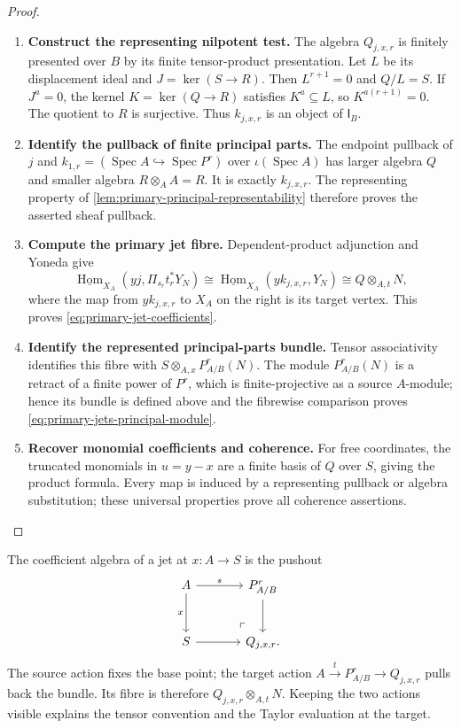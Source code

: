 \documentclass[11pt,a4paper]{article}
\numberwithin{algorithm}{section}
\numberwithin{equation}{section}
\theoremstyle{definition}
\theoremstyle{remark}
\theoremstyle{plain}
\newcommand{\Hom}{\operatorname{Hom}}
\newcommand{\InfB}{\mathsf I_B}
\theoremstyle{definition}
\theoremstyle{plain}
\begin{document}
\begin{proof}\leavevmode
\begin{enumerate}[leftmargin=*,align=left]
\item \textbf{Construct the representing nilpotent test.}
The algebra $Q_{j,x,r}$ is finitely presented over $B$ by its
finite tensor-product presentation.  Let $L$ be its displacement
ideal and $J=\ker(S\to R)$.  Then $L^{r+1}=0$ and $Q/L=S$.
If $J^a=0$, the kernel $K=\ker(Q\to R)$ satisfies $K^a\subseteq L$,
so $K^{a(r+1)}=0$.  The quotient to $R$ is surjective.
Thus $k_{j,x,r}$ is an object of $\InfB$.

\item \textbf{Identify the pullback of finite principal parts.}
The endpoint pullback of $j$ and
$k_{1,r}=(\operatorname{Spec}A\hookrightarrow\operatorname{Spec}P^r)$
over $\iota(\operatorname{Spec}A)$ has larger algebra $Q$ and
smaller algebra $R\otimes_AA=R$.  It is exactly $k_{j,x,r}$.
The representing property of \cref{lem:primary-principal-representability}
therefore proves the asserted sheaf pullback.

\item \textbf{Compute the primary jet fibre.}
Dependent-product
adjunction and Yoneda give
\[
 \underline{\Hom}_{X_A}(yj,\Pi_{s_r}t_r^*Y_N)
 \cong\underline{\Hom}_{X_A}(yk_{j,x,r},Y_N)
 \cong Q\otimes_{A,t}N,
\]
where the map from $yk_{j,x,r}$ to $X_A$ on the right is its
target vertex.  This proves \eqref{eq:primary-jet-coefficients}.

\item \textbf{Identify the represented principal-parts bundle.}
Tensor associativity identifies this fibre with
$S\otimes_{A,x}P^r_{A/B}(N)$.  The module $P^r_{A/B}(N)$
is a retract of a finite power of $P^r$, which is finite-projective
as a source $A$-module; hence its bundle is defined above and the
fibrewise comparison proves \eqref{eq:primary-jets-principal-module}.

\item \textbf{Recover monomial coefficients and coherence.}
For free coordinates, the truncated monomials in $u=y-x$ are a
finite basis of $Q$ over $S$, giving the product formula.
Every map is induced by a representing pullback or algebra substitution;
these universal properties prove all coherence assertions.
\end{enumerate}
\end{proof}


The coefficient algebra of a jet at $x:A\to S$ is the pushout
\[
\begin{tikzcd}[column sep=large,row sep=large]
 A \arrow[r,"{s}"] \arrow[d,"{x}"']
   & P^r_{A/B} \arrow[d]\\
 S \arrow[r] & Q_{j,x,r}\arrow[ul,phantom,"\ulcorner",very near start].
\end{tikzcd}
\]
The source action fixes the base point; the target action
$A\xrightarrow{t}P^r_{A/B}\to Q_{j,x,r}$ pulls back the bundle.
Its fibre is therefore $Q_{j,x,r}\otimes_{A,t}N$.
Keeping the two actions visible explains the tensor convention
and the Taylor evaluation at the target.
\end{document}
